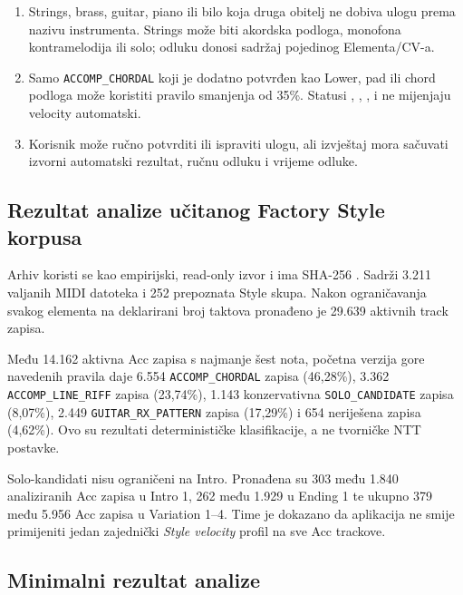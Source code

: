 \documentclass[11pt]{article}
\begin{document}
\begin{enumerate}[label=T\arabic*.]
    \item Strings, brass, guitar, piano ili bilo koja druga obitelj ne dobiva
    ulogu prema nazivu instrumenta. Strings može biti akordska podloga,
    monofona kontramelodija ili solo; odluku donosi sadržaj pojedinog
    Elementa/CV-a.

    \item Samo \texttt{ACCOMP\_CHORDAL} koji je dodatno potvrđen kao Lower,
    pad ili chord podloga može koristiti pravilo smanjenja od 35\%.
    Statusi , ,
    ,  i
     ne mijenjaju velocity automatski.

    \item Korisnik može ručno potvrditi ili ispraviti ulogu, ali izvještaj mora
    sačuvati izvorni automatski rezultat, ručnu odluku i vrijeme odluke.
\end{enumerate}

\subsection{Rezultat analize učitanog Factory Style korpusa}

Arhiv  koristi se kao empirijski,
read-only izvor i ima SHA-256
.
Sadrži 3.211 valjanih MIDI datoteka i 252 prepoznata Style skupa. Nakon
ograničavanja svakog elementa na deklarirani broj taktova pronađeno je 29.639
aktivnih track zapisa.

Među 14.162 aktivna Acc zapisa s najmanje šest nota, početna verzija gore
navedenih pravila daje 6.554 \texttt{ACCOMP\_CHORDAL} zapisa (46,28\%), 3.362
\texttt{ACCOMP\_LINE\_RIFF} zapisa (23,74\%), 1.143 konzervativna
\texttt{SOLO\_CANDIDATE} zapisa (8,07\%), 2.449
\texttt{GUITAR\_RX\_PATTERN} zapisa (17,29\%) i 654 neriješena zapisa
(4,62\%). Ovo su rezultati determinističke klasifikacije, a ne tvorničke NTT
postavke.

Solo-kandidati nisu ograničeni na Intro. Pronađena su 303 među 1.840 analiziranih
Acc zapisa u Intro 1, 262 među 1.929 u Ending 1 te ukupno 379 među 5.956 Acc
zapisa u Variation 1--4. Time je dokazano da aplikacija ne smije primijeniti
jedan zajednički \emph{Style velocity} profil na sve Acc trackove.

\subsection{Minimalni rezultat analize}
\end{document}
